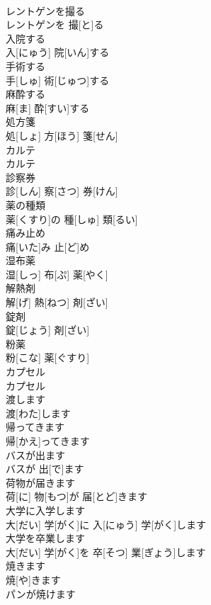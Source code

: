 \documentclass[8pt]{extreport}
\begin{document}
\begin{CJK}{UTF8}{min}
\\	レントゲンを撮る	
\\	レントゲンを 撮[と]る		
\\	入院する	
\\	入[にゅう] 院[いん]する		
\\	手術する	
\\	手[しゅ] 術[じゅつ]する		
\\	麻酔する	
\\	麻[ま] 酔[すい]する		
\\	処方箋	
\\	処[しょ] 方[ほう] 箋[せん]		
\\	カルテ	
\\	カルテ		
\\	診察券	
\\	診[しん] 察[さつ] 券[けん]		
\\	薬の種類	
\\	薬[くすり]の 種[しゅ] 類[るい]		
\\	痛み止め	
\\	痛[いた]み 止[ど]め		
\\	湿布薬	
\\	湿[しっ] 布[ぷ] 薬[やく]		
\\	解熱剤	
\\	解[げ] 熱[ねつ] 剤[ざい]		
\\	錠剤	
\\	錠[じょう] 剤[ざい]		
\\	粉薬	
\\	粉[こな] 薬[ぐすり]		
\\	カプセル	
\\	カプセル		
\\	渡します	
\\	渡[わた]します		
\\	帰ってきます	
\\	帰[かえ]ってきます		
\\	バスが出ます	
\\	バスが 出[で]ます		
\\	荷物が届きます	
\\	荷[に] 物[もつ]が 届[とど]きます		
\\	大学に入学します	
\\	大[だい] 学[がく]に 入[にゅう] 学[がく]します		
\\	大学を卒業します	
\\	大[だい] 学[がく]を 卒[そつ] 業[ぎょう]します		
\\	焼きます	
\\	焼[や]きます		
\\	パンが焼けます	

\end{CJK}
\end{document}
